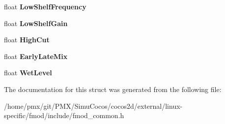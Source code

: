 \begin{DoxyCompactItemize}
float {\bfseries Low\+Shelf\+Frequency}
\item 
\mbox{\label{structFMOD__REVERB__PROPERTIES_a62d648ba78fd94ee54f61e5eebbe9bfb}} 
float {\bfseries Low\+Shelf\+Gain}
\item 
\mbox{\label{structFMOD__REVERB__PROPERTIES_ade1f9babf2907d9e1d6e17e5cbdc6d38}} 
float {\bfseries High\+Cut}
\item 
\mbox{\label{structFMOD__REVERB__PROPERTIES_af0982bfac28a7ca7c437c41d4389d1c8}} 
float {\bfseries Early\+Late\+Mix}
\item 
\mbox{\label{structFMOD__REVERB__PROPERTIES_abf5c49519616b2423fdb6447756c6380}} 
float {\bfseries Wet\+Level}
\end{DoxyCompactItemize}


The documentation for this struct was generated from the following file\+:\begin{DoxyCompactItemize}
\item 
/home/pmx/git/\+P\+M\+X/\+Simu\+Cocos/cocos2d/external/linux-\/specific/fmod/include/fmod\+\_\+common.\+h\end{DoxyCompactItemize}
